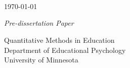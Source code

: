 \pagestyle{empty}




\begin{center}
{\Huge \textcolor{smartblue}{{\textsc{\MakeTextUppercase{{\thetitle}}}}}\\}


\vskip 1in
{\LARGE {}}\\
\vskip 0.75in
\theauthor \\
\monthyeardate\today

\vskip 0.75in
\textit{Pre-dissertation Paper} \\

\vskip 0.75in

Quantitative Methods in Education \\[2ex]
Department of Educational Psychology \\[-1.5ex]
University of Minnesota

\vfill

\end{center}

\makeatletter




\clearpage

\begin{abstract}

\begingroup
\obeylines
%
\endgroup%

\end{abstract}




\clearpage
\pagestyle{ruled}

\tableofcontents*
\clearpage

\listoftables
\clearpage

\listoffigures
\clearpage





\mainmatter

\SingleSpacing
